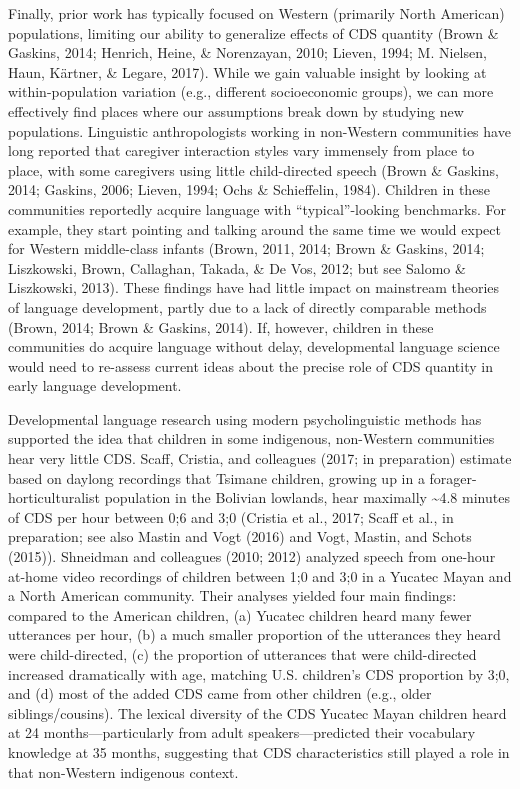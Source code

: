 \documentclass[floatsintext,man]{apa6}
\theoremstyle{definition}
\theoremstyle{definition}
\theoremstyle{definition}
\theoremstyle{remark}
\begin{document}
Finally, prior work has typically focused on Western (primarily North
American) populations, limiting our ability to generalize effects of CDS
quantity (Brown \& Gaskins, 2014; Henrich, Heine, \& Norenzayan, 2010;
Lieven, 1994; M. Nielsen, Haun, Kärtner, \& Legare, 2017). While we gain
valuable insight by looking at within-population variation (e.g.,
different socioeconomic groups), we can more effectively find places
where our assumptions break down by studying new populations. Linguistic
anthropologists working in non-Western communities have long reported
that caregiver interaction styles vary immensely from place to place,
with some caregivers using little child-directed speech (Brown \&
Gaskins, 2014; Gaskins, 2006; Lieven, 1994; Ochs \& Schieffelin, 1984).
Children in these communities reportedly acquire language with
\enquote{typical}-looking benchmarks. For example, they start pointing
and talking around the same time we would expect for Western
middle-class infants (Brown, 2011, 2014; Brown \& Gaskins, 2014;
Liszkowski, Brown, Callaghan, Takada, \& De Vos, 2012; but see Salomo \&
Liszkowski, 2013). These findings have had little impact on mainstream
theories of language development, partly due to a lack of directly
comparable methods (Brown, 2014; Brown \& Gaskins, 2014). If, however,
children in these communities do acquire language without delay,
developmental language science would need to re-assess current ideas
about the precise role of CDS quantity in early language development.

Developmental language research using modern psycholinguistic methods
has supported the idea that children in some indigenous, non-Western
communities hear very little CDS. Scaff, Cristia, and colleagues (2017;
in preparation) estimate based on daylong recordings that Tsimane
children, growing up in a forager-horticulturalist population in the
Bolivian lowlands, hear maximally \textasciitilde{}4.8 minutes of CDS
per hour between 0;6 and 3;0 (Cristia et al., 2017; Scaff et al., in
preparation; see also Mastin and Vogt (2016) and Vogt, Mastin, and
Schots (2015)). Shneidman and colleagues (2010; 2012) analyzed speech
from one-hour at-home video recordings of children between 1;0 and 3;0
in a Yucatec Mayan and a North American community. Their analyses
yielded four main findings: compared to the American children, (a)
Yucatec children heard many fewer utterances per hour, (b) a much
smaller proportion of the utterances they heard were child-directed, (c)
the proportion of utterances that were child-directed increased
dramatically with age, matching U.S. children's CDS proportion by 3;0,
and (d) most of the added CDS came from other children (e.g., older
siblings/cousins). The lexical diversity of the CDS Yucatec Mayan
children heard at 24 months---particularly from adult
speakers---predicted their vocabulary knowledge at 35 months, suggesting
that CDS characteristics still played a role in that non-Western
indigenous context.
\end{document}
